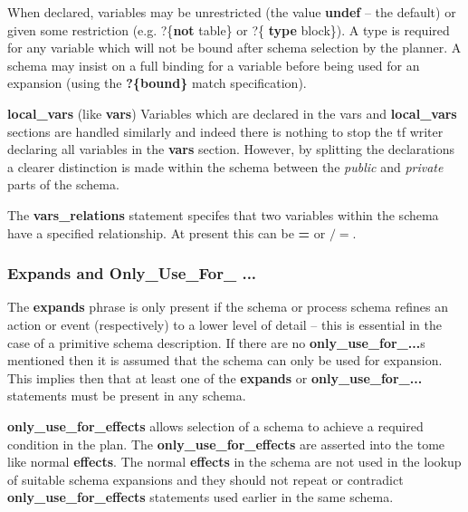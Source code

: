 When declared, variables may be unrestricted (the value {\bf undef} -- the
default) or given some restriction (e.g.  ?\{{\bf not} table\} or ?\{{\bf
type} block\}).  A type is required for any variable which will not be bound
after schema selection by the planner.  A schema may insist on a full binding
for a variable before being used for an expansion (using the {\bf ?\{bound\}}
match specification).

{\bf local\_vars} (like {\bf vars}) Variables which are declared in the vars
and {\bf local\_vars} sections are handled similarly and indeed there is
nothing to stop the {\sc tf} writer declaring all variables in the {\bf vars}
section.  However, by splitting the declarations a clearer distinction is made
within the schema between the {\em public} and {\em private} parts of the
schema.

\index{{\bf $=$}}
\index{{\bf $/=$}}
The {\bf vars\_relations} statement specifes that two variables within
the schema have a specified relationship.  At present this can be {\bf
=} or {\bf $/=$}. 

\subsubsection{Expands and Only\_Use\_For\_ ...}

The {\bf expands}  phrase is only present if the schema or
process schema refines an action or event (respectively) to a lower level of
detail -- this is essential in the case of a primitive schema description.  If
there are no {\bf only\_use\_for\_...}s mentioned then it is assumed that
the schema can only be used for expansion.  This implies then that at least
one of the {\bf expands} or {\bf only\_use\_for\_...} statements must be
present in any schema.

{\bf only\_use\_for\_effects} allows selection of a schema to achieve a
required condition in the plan.  The {\bf only\_use\_for\_effects} are
asserted into the {\sc tome} like normal {\bf effects}.  The normal {\bf
effects} in the schema are not used in the lookup of suitable schema
expansions and they should not repeat or contradict {\bf
only\_use\_for\_effects} statements used earlier in the same schema.

